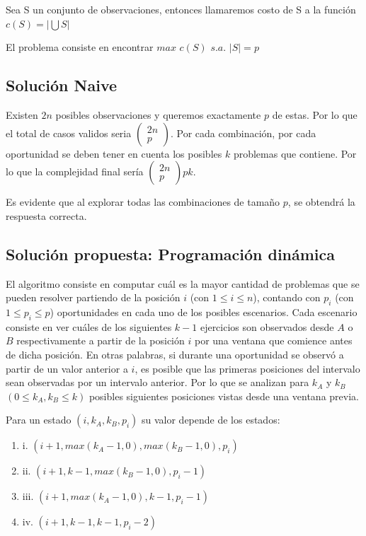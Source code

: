 \documentclass{article}
\begin{document}
Sea S un conjunto de observaciones, entonces llamaremos costo de S a la función $c(S)=|\bigcup S|$

El problema consiste en encontrar $max$ $c(S)$ $s.a.$ $|S|=p$

\subsection{Solución Naive}

Existen $2n$ posibles observaciones y queremos exactamente $p$ de estas. Por lo que el total de casos validos seria $
\begin{pmatrix}
2n \\
p
\end{pmatrix}
$. Por cada combinación, por cada oportunidad se deben tener en cuenta los posibles $k$ problemas que contiene. Por lo que la complejidad final sería $
\begin{pmatrix}
2n \\
p
\end{pmatrix}
pk$.

Es evidente que al explorar todas las combinaciones de tamaño $p$, se obtendrá la respuesta correcta.

\subsection{Solución propuesta: Programación dinámica}

El algoritmo consiste en computar cuál es la mayor cantidad de problemas que se pueden resolver partiendo de la posición $i$ (con $1\leq i\leq n$), contando con $p_i$ (con $1\leq p_i\leq p$) oportunidades en cada uno de los posibles escenarios. Cada escenario consiste en ver cuáles de los siguientes $k-1$ ejercicios son observados desde $A$ o $B$ respectivamente a partir de la posición $i$ por una ventana que comience antes de dicha posición. En otras palabras, si durante una oportunidad se observó a partir de un valor anterior a $i$, es posible que las primeras posiciones del intervalo sean observadas por un intervalo anterior. Por lo que se analizan para $k_A$ y $k_B$ $(0\leq k_A,k_B\leq k)$ posibles siguientes posiciones vistas desde una ventana previa.

Para un estado $(i,k_A,k_B,p_i)$ su valor depende de los estados:

\begin{enumerate}
    \item i. $(i+1,max(k_A-1,0),max(k_B-1,0),p_i)$
    \item ii. $(i+1,k-1,max(k_B-1,0),p_i-1)$
    \item iii. $(i+1,max(k_A-1,0),k-1,p_i-1)$
    \item iv. $(i+1,k-1,k-1,p_i-2)$
\end{enumerate}
\end{document}
